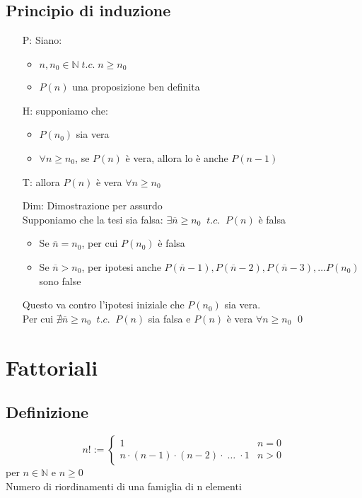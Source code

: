 \documentclass[a4paper]{article}
\begin{document}
\subsection{Principio di induzione}
\begin{itemize}
	\item[P:] Siano:
	\begin{itemize}
		\item \(n, n_0 \in \mathbb{N} \; t.c. \; n \geq n_0\)
		\item \(P(n)\) una proposizione ben definita
	\end{itemize}
	\item[H:] supponiamo che:
	\begin{itemize}
		\item \(P(n_0)\) sia vera
		\item \(\forall n \geq n_0\), se \(P(n)\) è vera, allora lo è anche \(P(n-1)\)
	\end{itemize}
	\item[T:] allora \(P(n)\) è vera \(\forall n \geq n_0\)
	\item[Dim:] Dimostrazione per assurdo \\
	Supponiamo che la tesi sia falsa: \(\exists \overline{n} \geq n_0 \;\; t.c. \;\; P(n)\) è falsa
	\begin{itemize}
		\item Se \(\overline{n} = n_0\), per cui \(P(n_0)\) è falsa
		\item Se \(\overline{n} > n_0\), per ipotesi anche \(P(\overline{n} - 1), P(\overline{n} - 2), P(\overline{n} - 3), \dots P(n_0)\) sono false
	\end{itemize}
	Questo va contro l'ipotesi iniziale che \(P(n_0)\) sia vera. \\
	Per cui \(\nexists \overline{n} \geq n_0 \;\; t.c. \;\; P(n)\) sia falsa e \(P(n)\) è vera \(\forall n \geq n_0\) \qed
\end{itemize}

\newpage

\section{Fattoriali}
\subsection{Definizione}
\begin{equation*}
	n! :=
	\begin{cases}
		1 & n = 0 \\
		n \cdot (n-1) \cdot (n-2) \cdot \; \dots \; \cdot 1 & n > 0 
	\end{cases}
\end{equation*}
per \(n \in \mathbb{N}\) e \(n \geq 0\) \\
Numero di riordinamenti di una famiglia di n elementi
\end{document}
